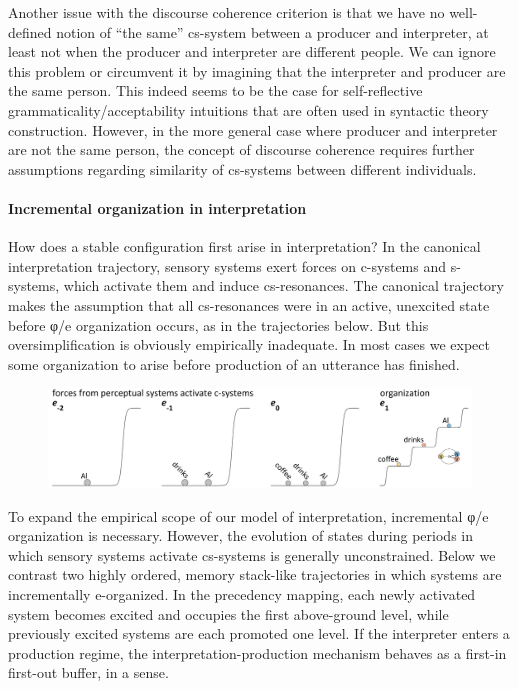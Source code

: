   Another issue with the discourse coherence criterion is that we have no well-defined notion of “the same” cs-system between a producer and interpreter, at least not when the producer and interpreter are different people. We can ignore this problem or circumvent it by imagining that the interpreter and producer are the same person. This indeed seems to be the case for self-reflective grammaticality/acceptability intuitions that are often used in syntactic theory construction. However, in the more general case where producer and interpreter are not the same person, the concept of discourse coherence requires further assumptions regarding similarity of cs-systems between different individuals.  

\paragraph{Incremental organization in interpretation}

How does a stable configuration first arise in interpretation? In the canonical interpretation trajectory, sensory systems exert forces on c-systems and s-systems, which activate them and induce cs-resonances. The canonical trajectory makes the assumption that all cs-resonances were in an active, unexcited state before φ/e organization occurs, as in the trajectories below. But this oversimplification is obviously empirically inadequate. In most cases we expect some organization to arise before production of an utterance has finished.

  
\begin{figure}
\includegraphics[width=\textwidth]{figures/Tilsen-img127.png}
\caption{\missingcaption}
\label{fig:}
\end{figure}
 

  To expand the empirical scope of our model of interpretation, incremental φ/e organization is necessary. However, the evolution of states during periods in which sensory systems activate cs-systems is generally unconstrained. Below we contrast two highly ordered, memory stack-like trajectories in which systems are incrementally e-organized. In the precedency mapping, each newly activated system becomes excited and occupies the first above-ground level, while previously excited systems are each promoted one level. If the interpreter enters a production regime, the interpretation-production mechanism behaves as a first-in first-out buffer, in a sense. 

